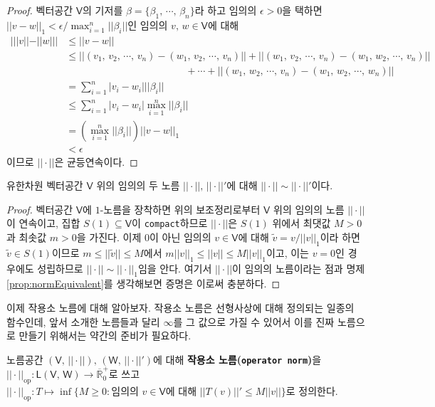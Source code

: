 \begin{proof}
    벡터공간 $\mathsf{V}$의 기저를 $\beta=\{\beta_1,\,\cdots,\,\beta_n\}$라 하고 임의의 $\epsilon>0$을 택하면 $||v-w||_1<\epsilon/\max_{i=1}^n||\beta_i||$인 임의의 $v,\,w\in\mathsf{V}$에 대해
    \begin{align*}
        |||v||-||w|||&\leq||v-w||\\
        &\leq||(v_1,\,v_2,\,\cdots,\,v_n)-(w_1,\,v_2,\,\cdots,\,v_n)||+||(w_1,\,v_2,\,\cdots,\,v_n)-(w_1,\,w_2,\,\cdots,\,v_n)||\\
        &\qquad\qquad\qquad\qquad\qquad\qquad+\cdots+||(w_1,\,w_2,\,\cdots,\,v_n)-(w_1,\,w_2,\,\cdots,\,w_n)||\\
        &=\sum_{i=1}^n|v_i-w_i|||\beta_i||\\
        &\leq\sum_{i=1}^n|v_i-w_i|\max_{i=1}^n||\beta_i||\\
        &=(\max_{i=1}^n||\beta_i||)||v-w||_1\\
        &<\epsilon
    \end{align*}
    이므로 $||\cdot||$은 균등연속이다.
\end{proof}

\begin{theorem}\label{thm:normEquiv}
    유한차원 벡터공간 $\mathsf{V}$ 위의 임의의 두 노름 $||\cdot||,\,||\cdot||'$에 대해 $||\cdot||\sim||\cdot||'$이다.
\end{theorem}

\begin{proof}
    벡터공간 $\mathsf{V}$에 $1$-노름을 장착하면 위의 보조정리로부터 $\mathsf{V}$ 위의 임의의 노름 $||\cdot||$이 연속이고, 집합 $S(1)\subseteq\mathsf{V}$이 \texttt{compact}하므로 $||\cdot||$은 $S(1)$ 위에서 최댓값 $M>0$과 최솟값 $m>0$을 가진다. 이제 $0$이 아닌 임의의 $v\in\mathsf{V}$에 대해 $\widetilde{v}=v/||v||_1$이라 하면 $\widetilde{v}\in S(1)$이므로 $m\leq||\widetilde{v}||\leq M$에서 $m||v||_1\leq||v||\leq M||v||_1$이고, 이는 $v=0$인 경우에도 성립하므로 $||\cdot||\sim||\cdot||_1$임을 안다. 여기서 $||\cdot||$이 임의의 노름이라는 점과 명제 \ref{prop:normEquivalent}를 생각해보면 증명은 이로써 충분하다.
\end{proof}

이제 작용소 노름에 대해 알아보자. 작용소 노름은 선형사상에 대해 정의되는 일종의 함수인데, 앞서 소개한 노름들과 달리 $\infty$를 그 값으로 가질 수 있어서 이를 진짜 노름으로 만들기 위해서는 약간의 준비가 필요하다.

\begin{definition}
    노름공간 $(\mathsf{V},\,||\cdot||),\,(\mathsf{W},\,||\cdot||')$에 대해 \textbf{작용소 노름(\texttt{operator norm})}을 $||\cdot||_\mathrm{op}:\mathsf{L}(\mathsf{V},\,\mathsf{W})\to\overline{\mathbb{R}}_0^+$로 쓰고 $||\cdot||_\mathrm{op}:T\mapsto\inf\{M\geq0:\textrm{임의의 $v\in\mathsf{V}$에 대해 $||T(v)||'\leq M||v||$}\}$로 정의한다.
\end{definition}

